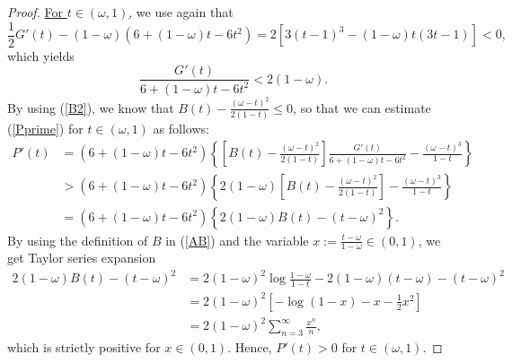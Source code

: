 \documentclass[10pt,a4paper]{amsart}
\begin{document}
\begin{proof}
\underline{For $t\in (\omega,1)$,} we use again that 
		\begin{equation*}
\frac{1}{2} G'(t) - (1-\omega)(6+ (1-\omega) t - 6t^2) = 2 \left [ 3(t-1)^3 - (1-\omega ) t (3t- 1) \right ] < 0, 
		\end{equation*}
which yields 
		\begin{equation*}
		\frac{G'(t)}{6+ (1-\omega) t - 6t^2} < 2(1-\omega). 
		\end{equation*}
By using (\ref{B2}), we know that $B(t) -  \frac{(\omega - t)^2}{2(1-t)}\leq 0$, 
so that we can estimate (\ref{Pprime}) for $t \in (\omega,1)$ as follows: 
		\begin{align*}
		P'(t) &= (6 + (1-\omega) t  - 6t^2) \left \{ \left [ B(t) - \frac{(\omega-t)^2}{2(1-t)} \right ] \frac{G'(t)}{6+ (1-\omega) t - 6t^2}  -\frac{(\omega-t)^3}{1-t} \right \} \\
		& > (6 + (1-\omega) t  - 6t^2) \left \{  2(1-\omega) \left [ B(t) - \frac{(\omega-t)^2}{2(1-t)} \right ] -\frac{(\omega-t)^3}{1-t} \right \} \\
				& =  (6 + (1-\omega) t  - 6t^2) \left \{  2 (1-\omega) B(t) - (t-\omega)^2 \right \}. 
		\end{align*}
By using the definition of $B$ in (\ref{AB}) and the variable $x := \frac{t- \omega}{1-\omega} \in (0,1)$, we get Taylor series expansion 
		\begin{align*}
2 (1-\omega) B(t) - (t-\omega)^2 &= 2 (1-\omega)^2 \log\frac{1-\omega}{1-t} - 2(1-\omega) (t-\omega) - (t-\omega)^2 \\
& =  2 (1-\omega)^2 \left[ -\log(1-x) - x -\frac{1}{2} x^2 \right] \\
&= 2 (1-\omega)^2 \sum_{n=3}^{\infty} \frac{x^n}{n},
\end{align*}
which is strictly positive for $x \in (0,1)$. Hence, $P'(t) > 0$ for $t\in (\omega, 1)$. 
\end{proof}
\end{document}
